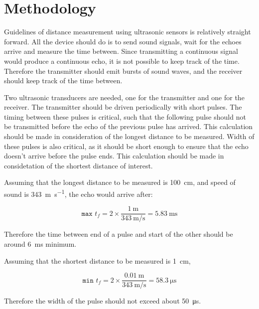 \documentclass[12pt, a4paper]{article}
\begin{document}
    \pagebreak
    \section{Methodology}
        
        Guidelines of distance measurement using ultrasonic sensors is relatively straight forward. All the device should do is to send sound signals, wait for the echoes arrive and measure the time between. Since transmitting a continuous signal would produce a continuous echo, it is not possible to keep track of the time. Therefore the transmitter should emit bursts of sound waves, and the receiver should keep track of the time between.

        \bigskip 

        Two ultrasonic transducers are needed, one for the transmitter and one for the receiver. The transmitter should be driven periodically with short pulses. The timing between these pulses is critical, such that the following pulse should not be transmitted before the echo of the previous pulse has arrived. This calculation should be made in consideration of the longest distance to be measured. Width of these pulses is also critical, as it should be short enough to ensure that the echo doesn't arrive before the pulse ends. This calculation should be made in considetation of the shortest distance of interest. 

        Assuming that the longest distance to be measured is \SI{100}{\centi\metre}, and speed of sound is \SI{343}{\metre\per\second}, the echo would arrive after:

        \begin{equation}
            \texttt{max }t_f = 2 \times \frac{\SI{1}{\metre}}{\SI{343}{\metre\per\second}} = \SI{5.83}{\milli\second}
        \end{equation}

        \noindent Therefore the time between end of a pulse and start of the other should be around \SI{6}{\milli\second} minimum. 

        \noindent Assuming that the shortest distance to be measured is \SI{1}{\centi\metre}, 

        \begin{equation}
            \texttt{min }t_f = 2 \times \frac{\SI{0.01}{\metre}}{\SI{343}{\metre\per\second}} = \SI{58.3}{\micro\second}
        \end{equation}

        \noindent Therefore the width of the pulse should not exceed about \SI{50}{\micro\second}.
\end{document}
